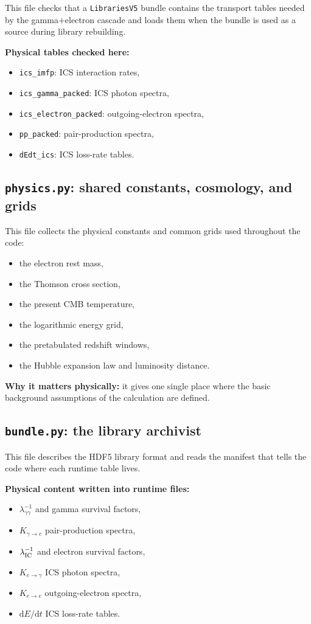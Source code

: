 \documentclass[11pt]{article}
\newcommand{\code}[1]{\texttt{#1}}
\newcommand{\dd}{\mathrm{d}}
\begin{document}
This file checks that a \code{LibrariesV5} bundle contains the transport tables
needed by the gamma$+$electron cascade and loads them when the bundle is used as
a source during library rebuilding.

\textbf{Physical tables checked here:}
\begin{itemize}
  \item \code{ics\_imfp}: ICS interaction rates,
  \item \code{ics\_gamma\_packed}: ICS photon spectra,
  \item \code{ics\_electron\_packed}: outgoing-electron spectra,
  \item \code{pp\_packed}: pair-production spectra,
  \item \code{dEdt\_ics}: ICS loss-rate tables.
\end{itemize}

\subsection{\code{physics.py}: shared constants, cosmology, and grids}

This file collects the physical constants and common grids used throughout the
code:
\begin{itemize}
  \item the electron rest mass,
  \item the Thomson cross section,
  \item the present CMB temperature,
  \item the logarithmic energy grid,
  \item the pretabulated redshift windows,
  \item the Hubble expansion law and luminosity distance.
\end{itemize}

\textbf{Why it matters physically:} it gives one single place where the basic
background assumptions of the calculation are defined.

\subsection{\code{bundle.py}: the library archivist}

This file describes the HDF5 library format and reads the manifest that tells
the code where each runtime table lives.

\textbf{Physical content written into runtime files:}
\begin{itemize}
  \item $\lambda_{\gamma\gamma}^{-1}$ and gamma survival factors,
  \item $K_{\gamma\rightarrow e}$ pair-production spectra,
  \item $\lambda_{\rm IC}^{-1}$ and electron survival factors,
  \item $K_{e\rightarrow\gamma}$ ICS photon spectra,
  \item $K_{e\rightarrow e}$ outgoing-electron spectra,
  \item $\dd E/\dd t$ ICS loss-rate tables.
\end{itemize}
\end{document}
